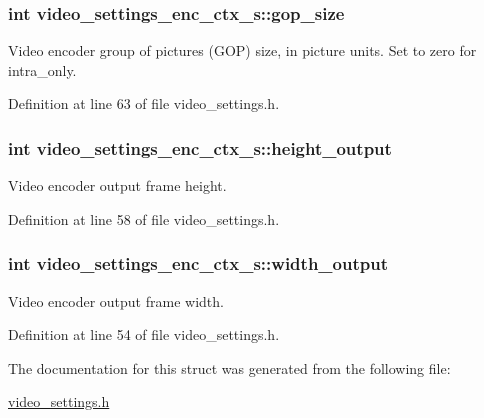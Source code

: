 \subsubsection[{\texorpdfstring{gop\+\_\+size}{gop_size}}]{\setlength{\rightskip}{0pt plus 5cm}int video\+\_\+settings\+\_\+enc\+\_\+ctx\+\_\+s\+::gop\+\_\+size}\hypertarget{structvideo__settings__enc__ctx__s_a9b995fd8437d3c4bd471ef2891b14c64}{}\label{structvideo__settings__enc__ctx__s_a9b995fd8437d3c4bd471ef2891b14c64}
Video encoder group of pictures (G\+OP) size, in picture units. Set to zero for intra\+\_\+only. 

Definition at line 63 of file video\+\_\+settings.\+h.

\subsubsection[{\texorpdfstring{height\+\_\+output}{height_output}}]{\setlength{\rightskip}{0pt plus 5cm}int video\+\_\+settings\+\_\+enc\+\_\+ctx\+\_\+s\+::height\+\_\+output}\hypertarget{structvideo__settings__enc__ctx__s_ac6b5478817ecb36b1b5211d7c9232cff}{}\label{structvideo__settings__enc__ctx__s_ac6b5478817ecb36b1b5211d7c9232cff}
Video encoder output frame height. 

Definition at line 58 of file video\+\_\+settings.\+h.

\subsubsection[{\texorpdfstring{width\+\_\+output}{width_output}}]{\setlength{\rightskip}{0pt plus 5cm}int video\+\_\+settings\+\_\+enc\+\_\+ctx\+\_\+s\+::width\+\_\+output}\hypertarget{structvideo__settings__enc__ctx__s_ab4ee3d991f865c4aa78016a720b50642}{}\label{structvideo__settings__enc__ctx__s_ab4ee3d991f865c4aa78016a720b50642}
Video encoder output frame width. 

Definition at line 54 of file video\+\_\+settings.\+h.



The documentation for this struct was generated from the following file\+:\begin{DoxyCompactItemize}
\item 
\hyperlink{video__settings_8h}{video\+\_\+settings.\+h}\end{DoxyCompactItemize}

